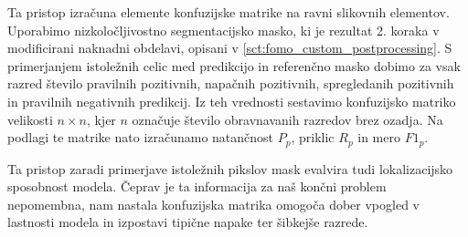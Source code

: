 \documentclass[a4paper,twoside,openright,12pt,slovene]{book}
\begin{document}
            Ta pristop izračuna elemente konfuzijske matrike na ravni slikovnih
            elementov.
            Uporabimo nizkoločljivostno segmentacijsko masko, ki je rezultat 2.
            koraka v modificirani naknadni obdelavi, opisani v
            \ref{sct:fomo_custom_postprocessing}.
            S primerjanjem istoležnih celic med predikcijo in referenčno masko
            dobimo za vsak razred število pravilnih pozitivnih, napačnih
            pozitivnih, spregledanih pozitivnih in pravilnih negativnih
            predikcij. Iz teh vrednosti sestavimo konfuzijsko matriko velikosti
            \(n\times n\), kjer \(n\) označuje število obravnavanih razredov
            brez ozadja. Na podlagi te matrike nato izračunamo natančnost
            $P_p$, priklic $R_p$ in mero $F1_p$.

            Ta pristop zaradi primerjave istoležnih pikslov mask evalvira tudi
            lokalizacijsko sposobnost modela. Čeprav je ta informacija za naš
            končni problem nepomembna, nam nastala konfuzijska matrika omogoča
            dober vpogled v lastnosti modela in izpostavi tipične napake ter
            šibkejše razrede.


\end{document}
